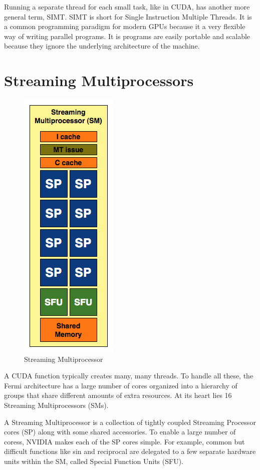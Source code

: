\documentclass[../main/report.tex]{subfiles}
\begin{document}
Running a separate thread for each small task, like in CUDA, has another more general term, SIMT.
SIMT is short for Single Instruction Multiple Threads.
It is a common programming paradigm for modern GPUs because it a very flexible way of writing parallel programs.
It is programs are easily portable and scalable because they ignore the underlying architecture of the machine.

\section{Streaming Multiprocessors}

\begin{figure}
\centering
\includegraphics[scale=0.40]{assets/SM.png}
\caption{Streaming Multiprocessor}
\label{fig:sm}
\end{figure}

A CUDA function typically creates many, many threads.
To handle all these, the Fermi architecture has a large number of cores organized into a hierarchy of groups that share different amounts of extra resources.
At its heart lies 16 Streaming Multiprocessors (SMs).

A Streaming Multiprocessor is a collection of tightly coupled Streaming Processor cores (SP) along with some shared accessories.
To enable a large number of coress, NVIDIA makes each of the SP cores simple.
For example, common but difficult functions like sin and reciprocal are delegated to a few separate hardware units within the SM, called Special Function Units (SFU).
\end{document}
